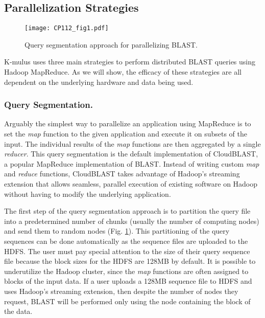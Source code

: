 \subsection{Parallelization Strategies}

\begin{figure}[!htb]%
\begin{center}
\texttt{[image: CP112\_fig1.pdf]}
\end{center}
\renewcommand{\baselinestretch}{1}
\small\normalsize
\begin{quote}
\caption{Query segmentation approach for parallelizing BLAST.}
\label{fig:strategies}
\end{quote}
\end{figure}
\renewcommand{\baselinestretch}{2}
\small\normalsize


K-mulus uses three main strategies to perform distributed BLAST queries using Hadoop MapReduce.
As we will show, the efficacy of these strategies are all dependent on the underlying hardware and data being used.
\subsubsection{Query Segmentation.}
Arguably the simplest way to parallelize an application using MapReduce is to set the \emph{map} function to the given application and execute it on subsets of the input.
The individual results of the \emph{map} functions are then aggregated by a single \emph{reducer}.
This query segmentation is the default implementation of CloudBLAST\cite{matsunaga2008cloudblast}, a popular MapReduce implementation of BLAST.
Instead of writing custom \emph{map} and \emph{reduce} functions, CloudBLAST takes advantage of Hadoop's streaming extension that allows seamless, parallel execution of existing software on Hadoop without having to modify the underlying application.

The first step of the query segmentation approach is to partition the query file into a predetermined number of chunks (usually the number of computing nodes) and send them to random nodes (Fig. \ref{fig:strategies}).
This partitioning of the query sequences can be done automatically as the sequence files are uploaded to the HDFS.
The user must pay special attention to the size of their query sequence file because the block sizes for the HDFS are 128MB by default.
It is possible to underutilize the Hadoop cluster, since the \emph{map} functions are often assigned to blocks of the input data.
If a user uploads a 128MB sequence file to HDFS and uses Hadoop's streaming extension, then despite the number of nodes they request, BLAST will be performed only using the node containing the block of the data.

